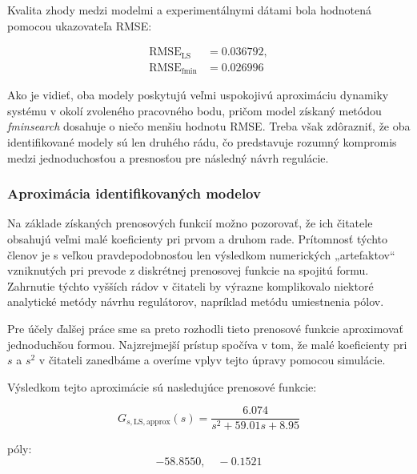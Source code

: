 Kvalita zhody medzi modelmi a experimentálnymi dátami bola hodnotená pomocou ukazovateľa RMSE:

\begin{align}
    \mathrm{RMSE}_{\mathrm{LS}} &= 0.036792,
    \label{eq:rmse_ls} \\
    \mathrm{RMSE}_{\mathrm{fmin}} &= 0.026996
    \label{eq:rmse_fmin}
\end{align}

Ako je vidieť, oba modely poskytujú veľmi uspokojivú aproximáciu dynamiky systému v okolí zvoleného pracovného bodu,  
pričom model získaný metódou \textit{fminsearch} dosahuje o niečo menšiu hodnotu RMSE.  
Treba však zdôrazniť, že oba identifikované modely sú len druhého rádu,  
čo predstavuje rozumný kompromis medzi jednoduchosťou a presnosťou pre následný návrh regulácie.


\subsubsection{Aproximácia identifikovaných modelov}

Na základe získaných prenosových funkcií možno pozorovať, že ich čitatele obsahujú veľmi malé koeficienty pri prvom a druhom rade.  
Prítomnosť týchto členov je s veľkou pravdepodobnosťou len výsledkom numerických „artefaktov“ vzniknutých pri prevode z diskrétnej prenosovej funkcie na spojitú formu.  
Zahrnutie týchto vyšších rádov v čitateli by výrazne komplikovalo niektoré analytické metódy návrhu regulátorov, napríklad metódu umiestnenia pólov.

Pre účely ďalšej práce sme sa preto rozhodli tieto prenosové funkcie aproximovať jednoduchšou formou.  
Najzrejmejší prístup spočíva v tom, že malé koeficienty pri $s$ a $s^2$ v čitateli zanedbáme a overíme vplyv tejto úpravy pomocou simulácie.

Výsledkom tejto aproximácie sú nasledujúce prenosové funkcie:

\begin{equation}
	G_{s,\mathrm{LS,approx}}(s) =
	\frac{6.074}{s^2 + 59.01s + 8.95}
	\label{eq:Gs_ls_approx}
\end{equation}

póly:
\begin{equation}
	-58.8550, \quad -0.1521
	\label{eq:poles_ls_approx}
\end{equation}

